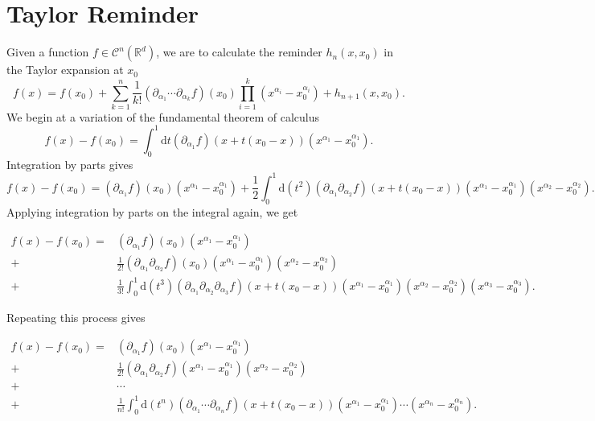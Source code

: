 \documentclass{book}
\newcommand{\mathd}{\mathrm{d}}
\begin{document}
\appendix\chapter{Taylor Reminder}

Given a function $f \in \mathcal{C}^n (\mathbb{R}^d)$, we are to calculate the
reminder $h_n (x, x_0)$ in the Taylor expansion at $x_0$
\[ f (x) = f (x_0) + \sum_{k = 1}^n \frac{1}{k!}  (\partial_{\alpha_1} \cdots
   \partial_{\alpha_k} f) (x_0)  \prod_{i = 1}^k (x^{\alpha_i} -
   x_0^{\alpha_i}) + h_{n + 1} (x, x_0) . \]
We begin at a variation of the fundamental theorem of calculus
\[ f (x) - f (x_0) = \int_0^1 \mathd t (\partial_{\alpha_1} f)  (x + t (x_0 -
   x))  (x^{\alpha_1} - x_0^{\alpha_1}) . \]
Integration by parts gives
\[ f (x) - f (x_0) = (\partial_{\alpha_1} f) (x_0)  (x^{\alpha_1} -
   x_0^{\alpha_1}) + \frac{1}{2}  \int_0^1 \mathd (t^2)  (\partial_{\alpha_1}
   \partial_{\alpha_2} f)  (x + t (x_0 - x))  (x^{\alpha_1} - x_0^{\alpha_1}) 
   (x^{\alpha_2} - x_0^{\alpha_2}) . \]
Applying integration by parts on the integral again, we get

\begin{align}
  f (x) - f (x_0) = & (\partial_{\alpha_1} f) (x_0)  (x^{\alpha_1} -
  x_0^{\alpha_1}) \nonumber\\
  + & \frac{1}{2!}  (\partial_{\alpha_1} \partial_{\alpha_2} f) (x_0) 
  (x^{\alpha_1} - x_0^{\alpha_1})  (x^{\alpha_2} - x_0^{\alpha_2}) \nonumber\\
  + & \frac{1}{3!}  \int_0^1 \mathd (t^3)  (\partial_{\alpha_1}
  \partial_{\alpha_2} \partial_{\alpha_3} f)  (x + t (x_0 - x))  (x^{\alpha_1}
  - x_0^{\alpha_1})  (x^{\alpha_2} - x_0^{\alpha_2})  (x^{\alpha_3} -
  x_0^{\alpha_3}) . \nonumber
\end{align}

Repeating this process gives

\begin{align}
  f (x) - f (x_0) = & (\partial_{\alpha_1} f) (x_0)  (x^{\alpha_1} -
  x_0^{\alpha_1}) \nonumber\\
  + & \frac{1}{2!}  (\partial_{\alpha_1} \partial_{\alpha_2} f)  (x^{\alpha_1}
  - x_0^{\alpha_1})  (x^{\alpha_2} - x_0^{\alpha_2}) \nonumber\\
  + & \cdots \nonumber\\
  + & \frac{1}{n!}  \int_0^1 \mathd (t^n)  (\partial_{\alpha_1} \cdots
  \partial_{\alpha_n} f)  (x + t (x_0 - x))  (x^{\alpha_1} - x_0^{\alpha_1})
  \cdots (x^{\alpha_n} - x_0^{\alpha_n}) . \nonumber
\end{align}
\end{document}
